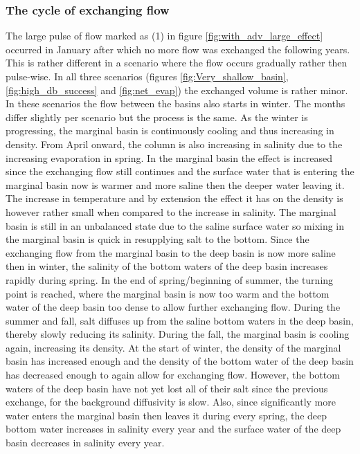 \documentclass[twocolumn]{article}
\begin{document}
\subsubsection{The cycle of exchanging flow}
\label{sect:flow_cycle}
The large pulse of flow marked as (1) in figure \ref{fig:with_adv_large_effect} occurred in January after which no more flow was exchanged the following years. This is rather different in a scenario where the flow occurs gradually rather then pulse-wise. In all three scenarios (figures \ref{fig:Very_shallow_basin}, \ref{fig:high_db_success} and \ref{fig:net_evap}) the exchanged volume is rather minor. In these scenarios the flow between the basins also starts in winter. The months differ slightly per scenario but the process is the same. As the winter is progressing, the marginal basin is continuously cooling and thus increasing in density. From April onward, the column is also increasing in salinity due to the increasing evaporation in spring. In the marginal basin the effect is increased since the exchanging flow still continues and the surface water that is entering the marginal basin now is warmer and more saline then the deeper water leaving it. The increase in temperature and by extension the effect it has on the density is however rather small when compared to the increase in salinity. The marginal basin is still in an unbalanced state due to the saline surface water so mixing in the marginal basin is quick in resupplying salt to the bottom. Since the exchanging flow from the marginal basin to the deep basin is now more saline then in winter, the salinity of the bottom waters of the deep basin increases rapidly during spring. In the end of spring/beginning of summer, the turning point is reached, where the marginal basin is now too warm and the bottom water of the deep basin too dense to allow further exchanging flow. 
During the summer and fall, salt diffuses up from the saline bottom waters in the deep basin, thereby slowly reducing its salinity. During the fall, the marginal basin is cooling again, increasing its density. At the start of winter, the density of the marginal basin has increased enough and the density of the bottom water of the deep basin has decreased enough to again allow for exchanging flow. However, the bottom waters of the deep basin have not yet lost all of their salt since the previous exchange, for the background diffusivity is slow. Also, since significantly more water enters the marginal basin then leaves it during every spring, the deep bottom water increases in salinity every year and the surface water of the deep basin decreases in salinity every year. 
\end{document}
